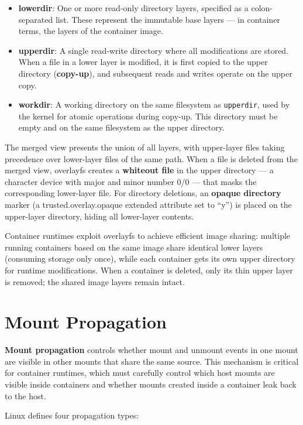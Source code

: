\begin{itemize}
  \item \textbf{lowerdir}: One or more read-only directory layers, specified as a colon-separated list. These represent the immutable base layers --- in container terms, the layers of the container image.
  \item \textbf{upperdir}: A single read-write directory where all modifications are stored. When a file in a lower layer is modified, it is first copied to the upper directory (\textbf{copy-up}), and subsequent reads and writes operate on the upper copy.
  \item \textbf{workdir}: A working directory on the same filesystem as \texttt{upperdir}, used by the kernel for atomic operations during copy-up. This directory must be empty and on the same filesystem as the upper directory.
\end{itemize}

The merged view presents the union of all layers, with upper-layer files taking precedence over lower-layer files of the same path. When a file is deleted from the merged view, overlayfs creates a \textbf{whiteout file} in the upper directory --- a character device with major and minor number 0/0 --- that masks the corresponding lower-layer file. For directory deletions, an \textbf{opaque directory} marker (a trusted.overlay.opaque extended attribute set to ``y'') is placed on the upper-layer directory, hiding all lower-layer contents.

Container runtimes exploit overlayfs to achieve efficient image sharing: multiple running containers based on the same image share identical lower layers (consuming storage only once), while each container gets its own upper directory for runtime modifications. When a container is deleted, only its thin upper layer is removed; the shared image layers remain intact.

\section{Mount Propagation}

\textbf{Mount propagation} controls whether mount and unmount events in one mount are visible in other mounts that share the same source. This mechanism is critical for container runtimes, which must carefully control which host mounts are visible inside containers and whether mounts created inside a container leak back to the host.

Linux defines four propagation types:

